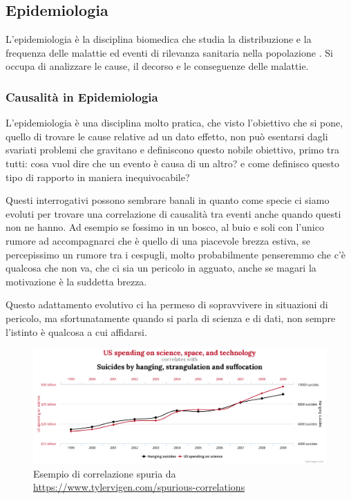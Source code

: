 \subsection{Epidemiologia}
L'epidemiologia è la disciplina biomedica che studia la 
distribuzione e la frequenza delle malattie ed eventi di 
rilevanza sanitaria nella popolazione \cite{wiki:Epidemiologia}.
Si occupa di analizzare le cause, il decorso e le 
conseguenze delle malattie.

\cite{Galea2009-lj} \cite{Parascandola2001-kw}

\subsubsection{Causalità in Epidemiologia}
L'epidemiologia è una disciplina molto pratica, che visto 
l'obiettivo che si pone, quello di trovare le cause
relative ad un dato effetto, non può esentarsi dagli 
svariati problemi che gravitano e definiscono questo 
nobile obiettivo, primo tra tutti: cosa vuol dire che un
evento è causa di un altro? e come definisco questo 
tipo di rapporto in maniera inequivocabile?

Questi interrogativi possono sembrare banali in quanto 
come specie ci siamo evoluti per trovare una correlazione
di causalità tra eventi anche quando questi non ne hanno.
Ad esempio se fossimo in un bosco, al buio e soli con
l'unico rumore ad accompagnarci che è quello di una 
piacevole brezza estiva, se percepissimo un rumore tra 
i cespugli, molto probabilmente penseremmo che c'è 
qualcosa che non va, che ci sia un pericolo in agguato, 
anche se magari la motivazione è la suddetta brezza. 

Questo adattamento evolutivo ci ha permeso di sopravvivere
in situazioni di pericolo, ma sfortunatamente quando 
si parla di scienza e di dati, non sempre l'istinto è qualcosa 
a cui affidarsi. 

\begin{figure}[h]
    \begin{center}
        \includegraphics[width=\linewidth]{img/chart.png}
        \caption{Esempio di correlazione spuria da \url{https://www.tylervigen.com/spurious-correlations}}
        \label{fig:spurious_relations}
    \end{center}
\end{figure}

